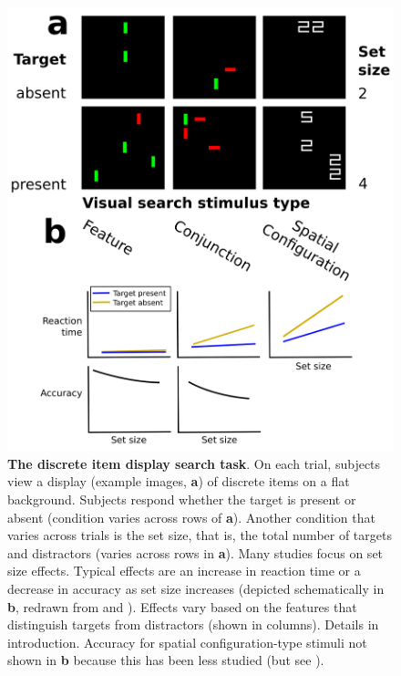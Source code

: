 \documentclass[10pt,letterpaper]{article}
\begin{document}
\begin{figure}[!ht]
\begin{center}
\includegraphics[width=\columnwidth]{fig1/fig1.png}
\end{center}
\caption{
\textbf{The discrete item display search task}. On each trial, subjects view  
 a display (example images, \textbf{a}) of discrete items on a flat background. Subjects 
respond whether the target is present or absent (condition varies across rows 
of \textbf{a}). Another condition that varies across trials is the set size, that is, 
the total number of targets and distractors (varies across rows in \textbf{a}). Many studies 
focus on set size effects. Typical effects are an increase in reaction time 
or a decrease in accuracy as set size increases (depicted schematically in \textbf{b}, 
redrawn from \cite{wolfeReactionTimeDistributions2010} and \cite{ecksteinLowerVisualSearch1998a}). 
Effects vary based on the features that distinguish targets from distractors 
(shown in columns). Details in introduction. Accuracy for spatial configuration-type 
stimuli not shown in \textbf{b} because this has been less studied (but see 
\cite{palmerSignalDetectionEvidence2011}).
}
\label{fig1}
\end{figure}
\end{document}
